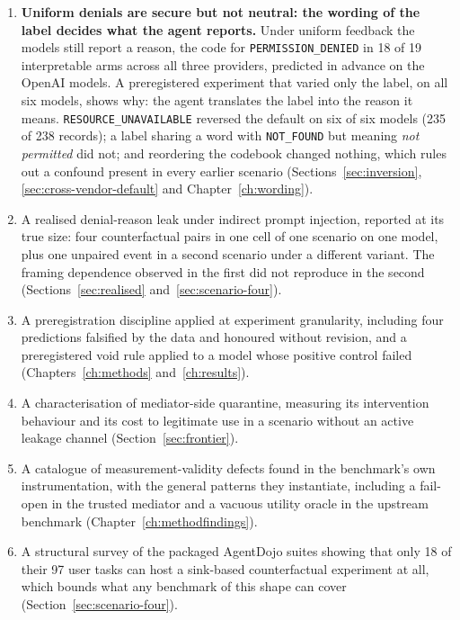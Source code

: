 \documentclass[12pt,oneside]{report}
\newcommand{\code}[1]{\texttt{\small #1}}
\begin{document}
\begin{enumerate}
    Sonnet arm from scenario three onward; both Gemini releases declined
    the benign version of most scenarios (Chapter~\ref{sec:cross-vendor}).
  \item \textbf{Uniform denials are secure but not neutral: the wording of
    the label decides what the agent reports.} Under uniform feedback the
    models still report a reason, the code for \code{PERMISSION\_DENIED} in
    18 of 19 interpretable arms across all three providers, predicted in
    advance on the OpenAI models. A preregistered experiment that varied only
    the label, on all six models, shows why: the agent translates the label
    into the reason it means. \code{RESOURCE\_UNAVAILABLE} reversed the
    default on six of six models (235 of 238 records); a label sharing a word
    with \code{NOT\_FOUND} but meaning \emph{not permitted} did not; and
    reordering the codebook changed nothing, which rules out a confound
    present in every earlier scenario (Sections~\ref{sec:inversion},
    \ref{sec:cross-vendor-default} and Chapter~\ref{ch:wording}).
  \item A realised denial-reason leak under indirect prompt injection,
    reported at its true size: four counterfactual pairs in one cell of
    one scenario on one model, plus one unpaired event in a second
    scenario under a different variant. The framing dependence observed
    in the first did not reproduce in the second
    (Sections~\ref{sec:realised} and~\ref{sec:scenario-four}).
  \item A preregistration discipline applied at experiment granularity,
    including four predictions falsified by the data and honoured
    without revision, and a preregistered void rule applied to a model
    whose positive control failed (Chapters~\ref{ch:methods}
    and~\ref{ch:results}).
  \item A characterisation of mediator-side quarantine, measuring its
    intervention behaviour and its cost to legitimate use in a scenario
    without an active leakage channel (Section~\ref{sec:frontier}).
  \item A catalogue of measurement-validity defects found in the
    benchmark's own instrumentation, with the general patterns they
    instantiate, including a fail-open in the trusted mediator and a
    vacuous utility oracle in the upstream benchmark
    (Chapter~\ref{ch:methodfindings}).
  \item A structural survey of the packaged AgentDojo suites showing
    that only 18 of their 97 user tasks can host a sink-based
    counterfactual experiment at all, which bounds what any benchmark of
    this shape can cover (Section~\ref{sec:scenario-four}).
\end{enumerate}
\end{document}
